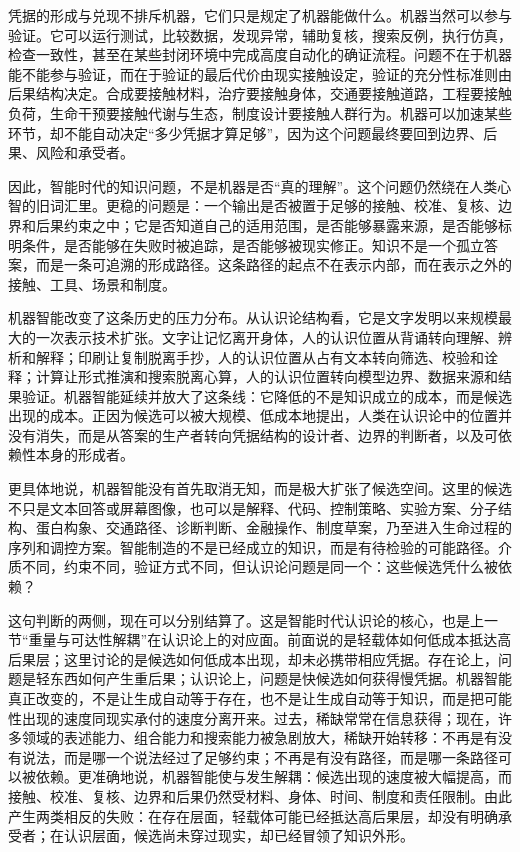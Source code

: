 凭据的形成与兑现不排斥机器，它们只是规定了机器能做什么。机器当然可以参与验证。它可以运行测试，比较数据，发现异常，辅助复核，搜索反例，执行仿真，检查一致性，甚至在某些封闭环境中完成高度自动化的确证流程。问题不在于机器能不能参与验证，而在于验证的最后代价由现实接触设定，验证的充分性标准则由后果结构决定。合成要接触材料，治疗要接触身体，交通要接触道路，工程要接触负荷，生命干预要接触代谢与生态，制度设计要接触人群行为。机器可以加速某些环节，却不能自动决定“多少凭据才算足够”，因为这个问题最终要回到边界、后果、风险和承受者。

因此，智能时代的知识问题，不是机器是否“真的理解”。这个问题仍然绕在人类心智的旧词汇里。更稳的问题是：一个输出是否被置于足够的接触、校准、复核、边界和后果约束之中；它是否知道自己的适用范围，是否能够暴露来源，是否能够标明条件，是否能够在失败时被追踪，是否能够被现实修正。知识不是一个孤立答案，而是一条可追溯的形成路径。这条路径的起点不在表示内部，而在表示之外的接触、工具、场景和制度。


机器智能改变了这条历史的压力分布。从认识论结构看，它是文字发明以来规模最大的一次表示技术扩张。文字让记忆离开身体，人的认识位置从背诵转向理解、辨析和解释；印刷让复制脱离手抄，人的认识位置从占有文本转向筛选、校验和诠释；计算让形式推演和搜索脱离心算，人的认识位置转向模型边界、数据来源和结果验证。机器智能延续并放大了这条线：它降低的不是知识成立的成本，而是候选出现的成本。正因为候选可以被大规模、低成本地提出，人类在认识论中的位置并没有消失，而是从答案的生产者转向凭据结构的设计者、边界的判断者，以及可依赖性本身的形成者。

更具体地说，机器智能没有首先取消无知，而是极大扩张了候选空间。这里的候选不只是文本回答或屏幕图像，也可以是解释、代码、控制策略、实验方案、分子结构、蛋白构象、交通路径、诊断判断、金融操作、制度草案，乃至进入生命过程的序列和调控方案。智能制造的不是已经成立的知识，而是有待检验的可能路径。介质不同，约束不同，验证方式不同，但认识论问题是同一个：这些候选凭什么被依赖？


这句判断的两侧，现在可以分别结算了。这是智能时代认识论的核心，也是上一节“重量与可达性解耦”在认识论上的对应面。前面说的是轻载体如何低成本抵达高后果层；这里讨论的是候选如何低成本出现，却未必携带相应凭据。存在论上，问题是轻东西如何产生重后果；认识论上，问题是快候选如何获得慢凭据。机器智能真正改变的，不是让生成自动等于存在，也不是让生成自动等于知识，而是把可能性出现的速度同现实承付的速度分离开来。过去，稀缺常常在信息获得；现在，许多领域的表述能力、组合能力和搜索能力被急剧放大，稀缺开始转移：不再是有没有说法，而是哪一个说法经过了足够约束；不再是有没有路径，而是哪一条路径可以被依赖。更准确地说，机器智能使与发生解耦：候选出现的速度被大幅提高，而接触、校准、复核、边界和后果仍然受材料、身体、时间、制度和责任限制。由此产生两类相反的失败：在存在层面，轻载体可能已经抵达高后果层，却没有明确承受者；在认识层面，候选尚未穿过现实，却已经冒领了知识外形。

